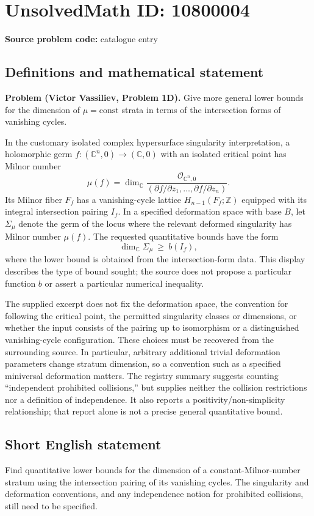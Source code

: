 \documentclass[11pt]{article}
\newcommand{\Z}{\mathbb{Z}}
\newcommand{\C}{\mathbb{C}}
\begin{document}
\section*{UnsolvedMath ID: 10800004}
\textbf{Source problem code:} catalogue entry
\subsection{Definitions and mathematical statement}
\textbf{Problem (Victor Vassiliev, Problem 1D).} Give more general lower bounds for the dimension of $\mu=\mathrm{const}$ strata in terms of the intersection forms of vanishing cycles.

In the customary isolated complex hypersurface singularity interpretation, a holomorphic germ $f:(\C^n,0)\to(\C,0)$ with an isolated critical point has Milnor number
\[
 \mu(f)=\dim_{\C}\frac{\mathcal O_{\C^n,0}}{(\partial f/\partial z_1,\ldots,\partial f/\partial z_n)}.
\]
Its Milnor fiber $F_f$ has a vanishing-cycle lattice $H_{n-1}(F_f;\Z)$ equipped with its integral intersection pairing $I_f$. In a specified deformation space with base $B$, let $\Sigma_\mu$ denote the germ of the locus where the relevant deformed singularity has Milnor number $\mu(f)$. The requested quantitative bounds have the form
\[
 \dim_{\C}\Sigma_\mu\ \ge\ b(I_f),
\]
where the lower bound is obtained from the intersection-form data. This display describes the type of bound sought; the source does not propose a particular function $b$ or assert a particular numerical inequality.

The supplied excerpt does not fix the deformation space, the convention for following the critical point, the permitted singularity classes or dimensions, or whether the input consists of the pairing up to isomorphism or a distinguished vanishing-cycle configuration. These choices must be recovered from the surrounding source. In particular, arbitrary additional trivial deformation parameters change stratum dimension, so a convention such as a specified miniversal deformation matters. The registry summary suggests counting ``independent prohibited collisions,'' but supplies neither the collision restrictions nor a definition of independence. It also reports a positivity/non-simplicity relationship; that report alone is not a precise general quantitative bound.
\subsection{Short English statement}
Find quantitative lower bounds for the dimension of a constant-Milnor-number stratum using the intersection pairing of its vanishing cycles. The singularity and deformation conventions, and any independence notion for prohibited collisions, still need to be specified.
\end{document}
